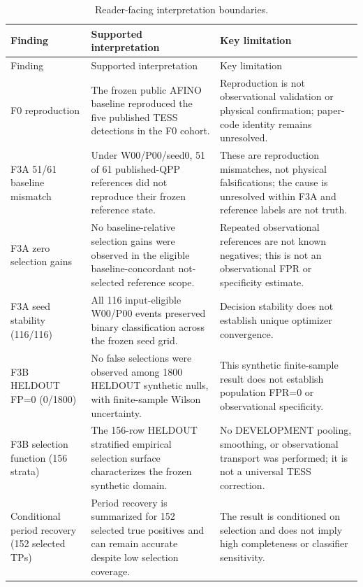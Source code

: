 \begin{longtable}{@{}>{\RaggedRight\arraybackslash}p{}>{\RaggedRight\arraybackslash}p{}>{\RaggedRight\arraybackslash}p{}@{}}
\caption{Reader-facing interpretation boundaries.}\label{tab:claim_boundaries}\\
\toprule
Finding & Supported interpretation & Key limitation \\
\midrule
\endfirsthead
\toprule
Finding & Supported interpretation & Key limitation \\
\midrule
\endhead
F0 reproduction & The frozen public AFINO baseline reproduced the five published TESS detections in the F0 cohort. & Reproduction is not observational validation or physical confirmation; paper-code identity remains unresolved. \\
F3A 51/61 baseline mismatch & Under W00/P00/seed0, 51 of 61 published-QPP references did not reproduce their frozen reference state. & These are reproduction mismatches, not physical falsifications; the cause is unresolved within F3A and reference labels are not truth. \\
F3A zero selection gains & No baseline-relative selection gains were observed in the eligible baseline-concordant not-selected reference scope. & Repeated observational references are not known negatives; this is not an observational FPR or specificity estimate. \\
F3A seed stability (116/116) & All 116 input-eligible W00/P00 events preserved binary classification across the frozen seed grid. & Decision stability does not establish unique optimizer convergence. \\
F3B HELDOUT FP=0 (0/1800) & No false selections were observed among 1800 HELDOUT synthetic nulls, with finite-sample Wilson uncertainty. & This synthetic finite-sample result does not establish population FPR=0 or observational specificity. \\
F3B selection function (156 strata) & The 156-row HELDOUT stratified empirical selection surface characterizes the frozen synthetic domain. & No DEVELOPMENT pooling, smoothing, or observational transport was performed; it is not a universal TESS correction. \\
Conditional period recovery (152 selected TPs) & Period recovery is summarized for 152 selected true positives and can remain accurate despite low selection coverage. & The result is conditioned on selection and does not imply high completeness or classifier sensitivity. \\

\end{longtable}
